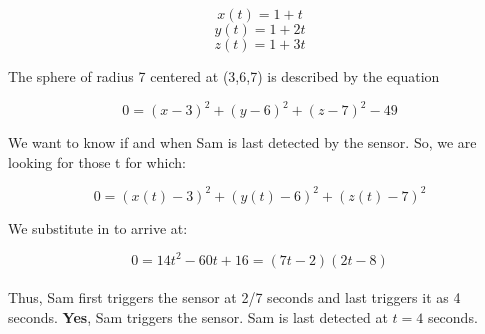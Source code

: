 \documentclass{article}
\begin{document}
$$x(t)=1+t$$
$$y(t)=1+2 t$$
$$z(t)=1+3 t$$


\begin{center}
The sphere of radius 7 centered at (3,6,7) is described by the equation
\end{center}

$$
0=(x-3)^{2}+(y-6)^{2}+(z-7)^{2}-49
$$

We want to know if and when Sam is last detected by the sensor. So, we are looking for those t for which:

$$0=(x(t)-3)^{2}+(y(t)-6)^{2}+(z(t)-7)^{2}$$

We substitute in to arrive at:

$$0=14 t^{2}-60 t+16=(7 t-2)(2 t-8)$$\\
%
Thus, Sam first triggers the sensor at 2/7 seconds and last triggers it as 4 seconds. \textbf{Yes}, Sam triggers the sensor. Sam is last detected at $\boxed{ t = 4 }$ seconds.
\end{document}
